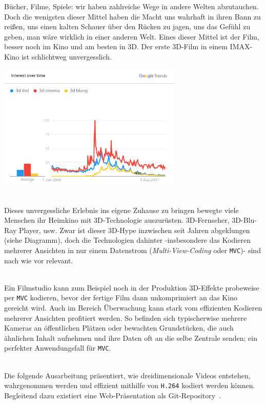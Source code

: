 B\"ucher, Filme, Spiele: wir haben zahlreiche Wege in andere Welten abzutauchen.
Doch die wenigsten dieser Mittel haben die Macht uns wahrhaft in ihren Bann zu rei{\ss}en, uns einen kalten Schauer
\"uber den R\"ucken zu jagen, uns das Gef\"uhl zu geben, man w\"are wirklich in einer anderen Welt.
Eines dieser Mittel ist der Film, besser noch im Kino und am besten in 3D.
Der erste 3D-Film in einem IMAX-Kino ist schlichtweg unvergesslich.

\begin{center}
    \includegraphics[width=0.66\textwidth]{../img/trends-3d.png}
\end{center}
\noindent\\ Dieses unvergessliche Erlebnis ins eigene Zuhause zu bringen bewegte viele Menschen ihr Heimkino mit 3D-Technologie
auszur\"usten.
3D-Fernseher, 3D-Blu-Ray Player, usw.
Zwar ist dieser 3D-Hype inzwischen seit Jahren abgeklungen (siehe Diagramm), doch die Technologien dahinter
-insbesondere das Kodieren mehrerer Ansichten in nur einem Datenstrom (\textit{Multi-View-Coding} oder \texttt{MVC})-
sind nach wie vor relevant.

\noindent\\ Ein Filmstudio kann zum Beispiel noch in der Produktion 3D-Effekte probeweise per \texttt{MVC} kodieren,
bevor der fertige Film dann unkomprimiert an das Kino gereicht wird.
Auch im Bereich \"Uberwachung kann stark vom effizienten Kodieren mehrerer Ansichten profitiert werden.
So befinden sich typischerwise mehrere Kameras an \"offentlichen Pl\"atzen oder bewachten Grundst\"ucken,
die auch \"ahnlichen Inhalt aufnehmen
und ihre Daten oft an die selbe Zentrale senden;
ein perfekter Anwendungsfall f\"ur \texttt{MVC}.

\noindent\\ Die folgende Ausarbeitung pr\"asentiert, wie dreidimensionale Videos entstehen, wahrgenommen werden und
effizient mithilfe von \texttt{H.264} kodiert werden k\"onnen.
Begleitend dazu existiert eine Web-Pr\"asentation als
Git-Repository~\cite{github}.
